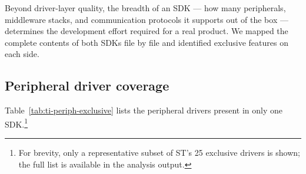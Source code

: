 Beyond driver-layer quality, the breadth of an SDK --- how many peripherals, middleware
stacks, and communication protocols it supports out of the box --- determines the
development effort required for a real product. We mapped the complete contents of both
SDKs file by file and identified exclusive features on each side.

\subsection{Peripheral driver coverage}
\label{subsec:ti-periph-gaps}

Table~\ref{tab:ti-periph-exclusive} lists the peripheral drivers present in only one
SDK.\footnote{For brevity, only a representative subset of ST's 25 exclusive drivers is
shown; the full list is available in the analysis output.}

